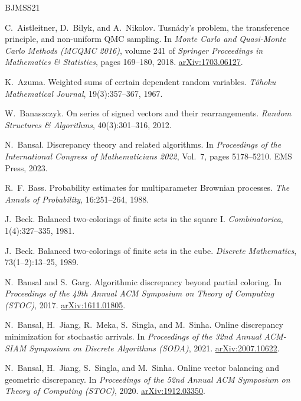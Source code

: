 \documentclass[11pt,letterpaper]{article}
\newcommand{\1}{\mathbf{1}}
\begin{document}
\begin{thebibliography}{BJMSS21}

C.~Aistleitner, D.~Bilyk, and A.~Nikolov.
\newblock Tusn\'ady's problem, the transference principle, and non-uniform QMC sampling.
\newblock In \emph{Monte Carlo and Quasi-Monte Carlo Methods (MCQMC 2016)}, volume 241 of \emph{Springer Proceedings in Mathematics \& Statistics}, pages 169--180, 2018. \href{https://arxiv.org/abs/1703.06127}{arXiv:1703.06127}.

K.~Azuma.
\newblock Weighted sums of certain dependent random variables.
\newblock \emph{T\^ohoku Mathematical Journal}, 19(3):357--367, 1967.

W.~Banaszczyk.
\newblock On series of signed vectors and their rearrangements.
\newblock \emph{Random Structures \& Algorithms}, 40(3):301--316, 2012.

N.~Bansal.
\newblock Discrepancy theory and related algorithms.
\newblock In \emph{Proceedings of the International Congress of Mathematicians 2022}, Vol.~7, pages 5178--5210. EMS Press, 2023.

R.~F. Bass.
\newblock Probability estimates for multiparameter Brownian processes.
\newblock \emph{The Annals of Probability}, 16:251--264, 1988.

J.~Beck.
\newblock Balanced two-colorings of finite sets in the square I.
\newblock \emph{Combinatorica}, 1(4):327--335, 1981.

J.~Beck.
\newblock Balanced two-colorings of finite sets in the cube.
\newblock \emph{Discrete Mathematics}, 73(1--2):13--25, 1989.

N.~Bansal and S.~Garg.
\newblock Algorithmic discrepancy beyond partial coloring.
\newblock In \emph{Proceedings of the 49th Annual ACM Symposium on Theory of Computing (STOC)}, 2017. \href{https://arxiv.org/abs/1611.01805}{arXiv:1611.01805}.

N.~Bansal, H.~Jiang, R.~Meka, S.~Singla, and M.~Sinha.
\newblock Online discrepancy minimization for stochastic arrivals.
\newblock In \emph{Proceedings of the 32nd Annual ACM-SIAM Symposium on Discrete Algorithms (SODA)}, 2021. \href{https://arxiv.org/abs/2007.10622}{arXiv:2007.10622}.

N.~Bansal, H.~Jiang, S.~Singla, and M.~Sinha.
\newblock Online vector balancing and geometric discrepancy.
\newblock In \emph{Proceedings of the 52nd Annual ACM Symposium on Theory of Computing (STOC)}, 2020. \href{https://arxiv.org/abs/1912.03350}{arXiv:1912.03350}.


\end{thebibliography}
\end{document}
